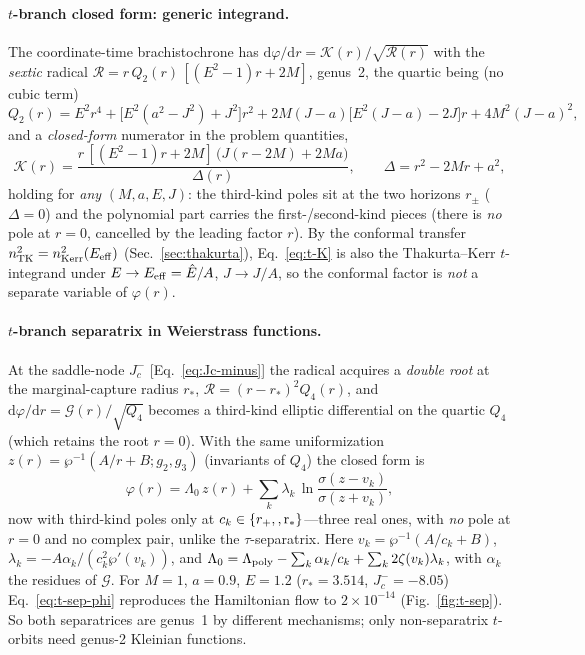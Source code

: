 \documentclass[12pt]{iopart}
\newcommand{\Ehat}{\hat E}
\newcommand{\rp}{r_{+}}
\newcommand{\dd}{\mathrm{d}}
\begin{document}
\paragraph{$t$-branch closed form: generic integrand.} The coordinate-time
brachistochrone has $\dd\varphi/\dd r=\mathcal K(r)/\sqrt{\mathcal R(r)}$ with the
\emph{sextic} radical $\mathcal R=r\,Q_2(r)\,[(E^2-1)r+2M]$, genus~2, the quartic
being (no cubic term)
\begin{equation}
    Q_2(r)=E^2r^4+\big[E^2(a^2-J^2)+J^2\big]r^2
      +2M(J-a)\big[E^2(J-a)-2J\big]r+4M^2(J-a)^2,
    \label{eq:t-Q2}
\end{equation}
and a \emph{closed-form} numerator in the problem quantities,
\begin{equation}
    \mathcal K(r)=\frac{r\,[(E^2-1)r+2M]\,\big(J(r-2M)+2Ma\big)}{\Delta(r)},
    \qquad \Delta=r^2-2Mr+a^2,
    \label{eq:t-K}
\end{equation}
holding for \emph{any} $(M,a,E,J)$: the third-kind poles sit at the two horizons
$r_\pm$ ($\Delta=0$) and the polynomial part carries the first-/second-kind
pieces (there is \emph{no} pole at $r=0$, cancelled by the leading factor $r$).
By the conformal transfer $n^2_{\rm TK}=n^2_{\rm Kerr}(E_{\rm eff})$
(Sec.~\ref{sec:thakurta}), Eq.~\eqref{eq:t-K} is also the Thakurta--Kerr
$t$-integrand under $E\to E_{\rm eff}=\Ehat/A$, $J\to J/A$, so the conformal
factor is \emph{not} a separate variable of $\varphi(r)$.

\paragraph{$t$-branch separatrix in Weierstrass functions.} At the saddle-node
$J_c^-$ [Eq.~\eqref{eq:Jc-minus}] the radical acquires a
\emph{double root} at the marginal-capture radius $r_*$,
$\mathcal R=(r-r_*)^2 Q_4(r)$, and
$\dd\varphi/\dd r=\mathcal G(r)/\sqrt{Q_4}$ becomes a third-kind elliptic
differential on the quartic $Q_4$ (which retains the root $r=0$). With the same
uniformization $z(r)=\wp^{-1}(A/r+B;g_2,g_3)$ (invariants of $Q_4$) the closed
form is
\begin{equation}
    \varphi(r)=\Lambda_0\,z(r)+\sum_{k}\lambda_k\,
      \ln\frac{\sigma(z-v_k)}{\sigma(z+v_k)},
    \label{eq:t-sep-phi}
\end{equation}
now with third-kind poles only at $c_k\in\{\rp,\rm,r_*\}$---three real ones, with
\emph{no} pole at $r=0$ and no complex pair, unlike the $\tau$-separatrix. Here
$v_k=\wp^{-1}(A/c_k+B)$, $\lambda_k=-A\alpha_k/(c_k^2\wp'(v_k))$, and
$\Lambda_0=\Lambda_{\rm poly}-\sum_k\alpha_k/c_k+\sum_k 2\zeta(v_k)\lambda_k$,
with $\alpha_k$ the residues of $\mathcal G$. For $M=1$, $a=0.9$, $E=1.2$
($r_*=3.514$, $J_c^-=-8.05$) Eq.~\eqref{eq:t-sep-phi} reproduces the Hamiltonian
flow to $2\times10^{-14}$ (Fig.~\ref{fig:t-sep}). So both separatrices are
genus~1 by different mechanisms; only non-separatrix $t$-orbits need genus-2
Kleinian functions.
\end{document}
